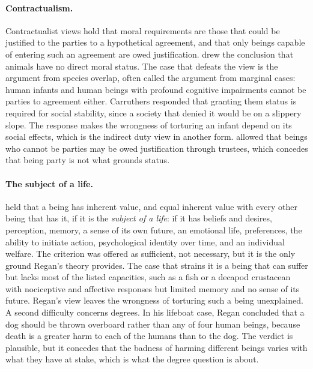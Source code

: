 \documentclass{situationist-preprint}
\begin{document}
\paragraph{Contractualism.} Contractualist views hold that moral requirements are those that could be justified to the parties to a hypothetical agreement, and that only beings capable of entering such an agreement are owed justification. \citet{Carruthers1992} drew the conclusion that animals have no direct moral status. The case that defeats the view is the argument from species overlap, often called the argument from marginal cases: human infants and human beings with profound cognitive impairments cannot be parties to agreement either. Carruthers responded that granting them status is required for social stability, since a society that denied it would be on a slippery slope. The response makes the wrongness of torturing an infant depend on its social effects, which is the indirect duty view in another form. \citet[ch.~4]{Scanlon1998} allowed that beings who cannot be parties may be owed justification through trustees, which concedes that being party is not what grounds status.

\paragraph{The subject of a life.} \citet{Regan1983} held that a being has inherent value, and equal inherent value with every other being that has it, if it is the \emph{subject of a life}: if it has beliefs and desires, perception, memory, a sense of its own future, an emotional life, preferences, the ability to initiate action, psychological identity over time, and an individual welfare. The criterion was offered as sufficient, not necessary, but it is the only ground Regan's theory provides. The case that strains it is a being that can suffer but lacks most of the listed capacities, such as a fish or a decapod crustacean with nociceptive and affective responses but limited memory and no sense of its future. Regan's view leaves the wrongness of torturing such a being unexplained. A second difficulty concerns degrees. In his lifeboat case, Regan concluded that a dog should be thrown overboard rather than any of four human beings, because death is a greater harm to each of the humans than to the dog. The verdict is plausible, but it concedes that the badness of harming different beings varies with what they have at stake, which is what the degree question is about.
\end{document}
